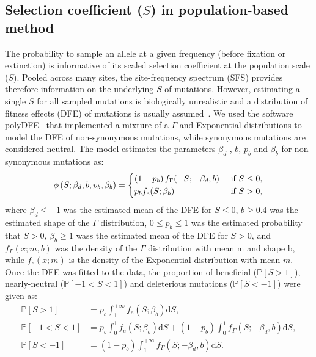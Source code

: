 \documentclass{article}
\newcommand{\der}{\textrm{d}}
\newcommand{\proba}{\mathbb{P}}
\newcommand{\Spop}{S}
\newcommand{\polyDel}{\Spop < -1}
\newcommand{\polyNeutral}{-1 < \Spop < 1}
\newcommand{\polyAdv}{ \Spop > 1}
\newcommand{\PpolyDel}{\proba \left[ \polyDel \right]}
\newcommand{\PpolyNeutral}{\proba \left[ \polyNeutral \right]}
\newcommand{\PpolyAdv}{\proba \left[ \polyAdv \right]}
\newcommand{\AdvMean}{\beta_b}
\newcommand{\DelMean}{\beta_d}
\begin{document}
    \subsection{Selection coefficient ($\Spop$) in population-based method}
    \label{subsec:s-polymorphism-method}
    The probability to sample an allele at a given frequency (before fixation or extinction) is informative of its scaled selection coefficient at the population scale ($\Spop$).
    Pooled across many sites, the site-frequency spectrum (SFS) provides therefore information on the underlying $\Spop$ of mutations.
    However, estimating a single $\Spop$ for all sampled mutations is biologically unrealistic and a distribution of fitness effects (DFE) of mutations is usually assumed~\cite{eyre-walker_distribution_2006, eyre-walker_estimating_2009}.
    We used the software polyDFE~\cite{tataru_inference_2017, tataru_polydfe_2020} that implemented a mixture of a $\Gamma$ and Exponential distributions to model the DFE of non-synonymous mutations, while synonymous mutations are considered neutral.
    The model estimates the parameters $\DelMean$ , $b$, $p_b$ and $\AdvMean$ for non-synonymous mutations as:
    \begin{equation}
        \phi \left( \Spop; \DelMean , b, p_b, \AdvMean \right) =
        \begin{dcases}
            \left( 1 - p_b \right) f_{\Gamma}(-\Spop; -\DelMean, b) & \text{ if $\Spop \leq 0$,} \\
            p_b f_{e}(\Spop; \AdvMean) & \text{ if $\Spop > 0$,} \\
        \end{dcases}
    \end{equation}
    where $\DelMean \leq -1 $ was the estimated mean of the DFE for $\Spop \leq 0$,
    $b \geq 0.4$ was the estimated shape of the $\Gamma$ distribution,
    $0 \leq p_b \leq 1$ was the estimated probability that $\Spop > 0$,
    $\AdvMean \geq 1$ wass the estimated mean of the DFE for $\Spop > 0$,
    and $f_{\Gamma}(x; m, b)$ was the density of the $\Gamma$ distribution with mean m and shape b, while $f_{e}(x; m)$ is the density of the Exponential distribution with mean $m$.
    Once the DFE was fitted to the data, the proportion of beneficial ($\PpolyAdv$), nearly-neutral ($\PpolyNeutral$) and deleterious mutations ($\PpolyDel$) were given as:
    \begin{align}
        \PpolyAdv &= p_b \int_{1}^{+\infty} f_{e}(\Spop; \AdvMean) \der \Spop,  \label{eq:polyProbaAdv} \\
        \PpolyNeutral &= p_b \int_{0}^{1} f_{e}(\Spop; \AdvMean) \der \Spop + \left( 1 - p_b \right) \int_{0}^{1} f_{\Gamma}(\Spop; -\DelMean, b) \der \Spop, \\
        \PpolyDel &= \left( 1 - p_b \right) \int_{1}^{+\infty} f_{\Gamma}(\Spop; -\DelMean, b) \der \Spop. \label{eq:polyProbaDel}
    \end{align}
\end{document}
